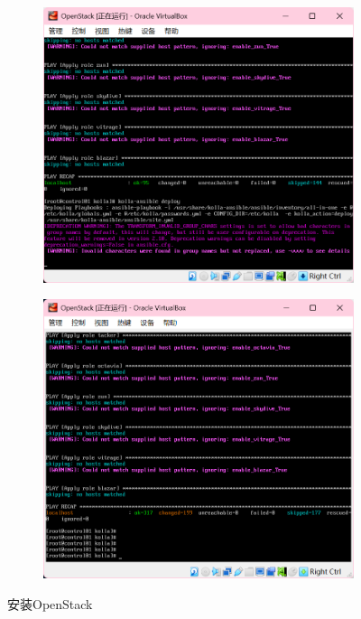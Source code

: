 \documentclass{article}
\begin{document}
\begin{figure}[H]
    \centering
    \begin{subfigure}[b]{0.47\textwidth}
        \includegraphics[width=\textwidth]{img/7.2.png}
    \end{subfigure}
    \begin{subfigure}[b]{0.47\textwidth}
        \includegraphics[width=\textwidth]{img/7.3.png}
    \end{subfigure}
    \caption{安装OpenStack}
\end{figure}
\end{document}
